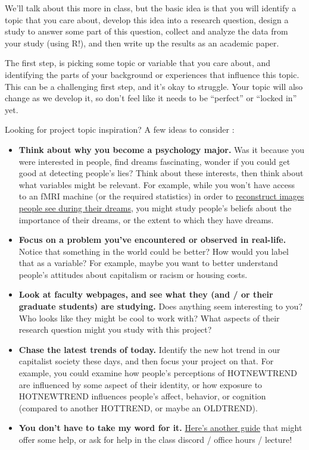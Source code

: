 \documentclass[
  letterpaper,
  DIV=11,
  numbers=noendperiod,
  oneside]{scrreprt}
\begin{document}
We'll talk about this more in class, but the basic idea is that you will
identify a topic that you care about, develop this idea into a research
question, design a study to answer some part of this question, collect
and analyze the data from your study (using R!), and then write up the
results as an academic paper.

The first step, is picking some topic or variable that you care about,
and identifying the parts of your background or experiences that
influence this topic. This can be a challenging first step, and it's
okay to struggle. Your topic will also change as we develop it, so don't
feel like it needs to be ``perfect'' or ``locked in'' yet.

Looking for project topic inspiration? A few ideas to consider :

\begin{itemize}
\item
  \textbf{Think about why you become a psychology major.} Was it because
  you were interested in people, find dreams fascinating, wonder if you
  could get good at detecting people's lies? Think about these
  interests, then think about what variables might be relevant. For
  example, while you won't have access to an fMRI machine (or the
  required statistics) in order to
  \href{https://www.youtube.com/watch?v=inaH_i_TjV4}{reconstruct images
  people see during their dreams}, you might study people's beliefs
  about the importance of their dreams, or the extent to which they have
  dreams.
\item
  \textbf{Focus on a problem you've encountered or observed in
  real-life.} Notice that something in the world could be better? How
  would you label that as a variable? For example, maybe you want to
  better understand people's attitudes about capitalism or racism or
  housing costs.
\item
  \textbf{Look at faculty webpages, and see what they (and / or their
  graduate students) are studying.} Does anything seem interesting to
  you? Who looks like they might be cool to work with? What aspects of
  their research question might you study with this project?
\item
  \textbf{Chase the latest trends of today.} Identify the new hot trend
  in our capitalist society these days, and then focus your project on
  that. For example, you could examine how people's perceptions of
  HOTNEWTREND are influenced by some aspect of their identity, or how
  exposure to HOTNEWTREND influences people's affect, behavior, or
  cognition (compared to another HOTTREND, or maybe an OLDTREND).
\item
  \textbf{You don't have to take my word for it.}
  \href{https://libguides.usc.edu/writingguide/introduction/researchproblem}{Here's
  another guide} that might offer some help, or ask for help in the
  class discord / office hours / lecture!
\end{itemize}
\end{document}

